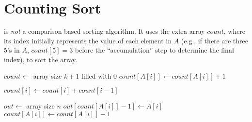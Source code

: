 \documentclass{report}
\begin{document}
\section{Counting Sort}

 is \textit{not} a comparison based sorting algorithm. It uses the extra array $count$, where its index initially represents the value of each element in $A$ (e.g., if there are three 5's in $A$, $count[5] = 3$ before the ``accumulation'' step to determine the final index), to sort the array.

\begin{algorithm}
    \begin{algorithmic}[0]
       
        \State $count \gets$ array size $k + 1$ filled with 0
         
          \State $count[A[i]] \gets count[A[i]] + 1$
        \EndFor
        \item[]
         
          \State $count[i] \gets count[i] + count[i - 1]$
        \EndFor
        \item[]
        \State $out \gets$ array size $n$
         
          \State $out[count[A[i]] - 1] \gets A[i]$
          \State $count[A[i]] \gets count[A[i]] - 1$
        \EndFor
        \item[]
        \State {}
      \EndFunction
    \end{algorithmic}
\end{algorithm}
\end{document}
